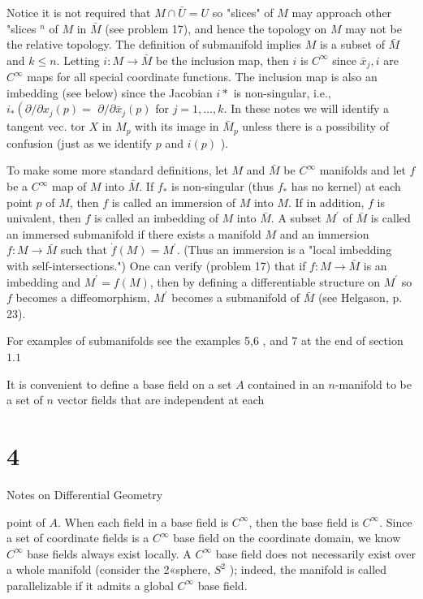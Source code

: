 \documentclass[10pt]{article}
\begin{document}
Notice it is not required that $M \cap \bar{U}=U$ so "slices" of $M$ may approach other "slices ${ }^{n}$ of $M$ in $\bar{M}$ (see problem 17), and hence the topology on $M$ may not be the relative topology. The definition of submanifold implies $M$ is a subset of $\bar{M}$ and $k \leq n$. Letting $i: M \rightarrow \bar{M}$ be the inclusion map, then $i$ is $C^{\infty}$ since $\bar{x}_{j}, i$ are $C^{\infty}$ maps for all special coordinate functions. The inclusion map is also an imbedding (see below) since the Jacobian $i *$ is non-singular, i.e., $i_{*}\left(\partial / \partial x_{j}(p)=\right.$ $\partial / \partial \bar{x}_{j}(p)$ for $j=1, \ldots, k$. In these notes we will identify a tangent vec. tor $X$ in $M_{p}$ with its image in $\bar{M}_{p}$ unless there is a possibility of confusion (just as we identify $p$ and $i(p)$ ).

To make some more standard definitions, let $M$ and $\bar{M}$ be $C^{\infty}$ manifolds and let $f$ be a $C^{\infty}$ map of $M$ into $\bar{M}$. If $f_{*}$ is non-singular (thus $f_{*}$ has no kernel) at each point $p$ of $M$, then $f$ is called an immersion of $M$ into $M$. If in addition, $f$ is univalent, then $f$ is called an imbedding of $M$ into $\bar{M}$. A subset $M^{\prime}$ of $\bar{M}$ is called an immersed submanifold if there exists a manifold $M$ and an immersion $f: M \rightarrow \bar{M}$ such that $\dot{f}(M)=M^{\prime}$. (Thus an immersion is a "local imbedding with self-intersections.") One can verify (problem 17) that if $f: M \rightarrow \bar{M}$ is an imbedding and $M^{\prime}=f(M)$, then by defining a differentiable structure on $M^{\prime}$ so $f$ becomes a diffeomorphism, $M^{\prime}$ becomes a submanifold of $\bar{M}$ (see Helgason, p. 23).

For examples of submanifolds see the examples 5,6 , and 7 at the end of section $1.1$

It is convenient to define a base field on a set $A$ contained in an $n$-manifold to be a set of $n$ vector fields that are independent at each

\section{4}
Notes on Differential Geometry

point of $A$. When each field in a base field is $C^{\infty}$, then the base field is $C^{\infty}$. Since a set of coordinate fields is a $C^{\infty}$ base field on the coordinate domain, we know $C^{\infty}$ base fields always exist locally. A $C^{\infty}$ base field does not necessarily exist over a whole manifold (consider the 2«sphere, $S^{2}$ ); indeed, the manifold is called parallelizable if it admits a global $C^{\infty}$ base field.
\end{document}
